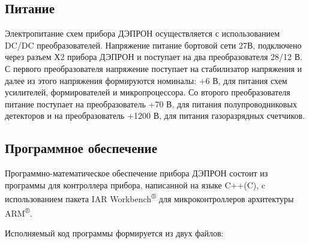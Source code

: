 \subsection{Питание}

Электропитание схем прибора ДЭПРОН осуществляется с использованием DC/DC преобразователей. Напряжение питание бортовой сети 27В, подключено через разъем Х2 прибора ДЭПРОН и поступает на два преобразователя 28/12 В. С первого преобразователя напряжение поступает на стабилизатор напряжения и далее из этого напряжения формируются номиналы: +6 В, для питания схем усилителей, формирователей и микропроцессора. Со второго преобразователя питание поступает на преобразователь +70 В, для питания полупроводниковых детекторов и на преобразователь +1200 В, для питания газоразрядных счетчиков. 

\subsection{Программное обеспечение}

Программно-математическое обеспечение прибора ДЭПРОН состоит из программы для контроллера прибора, написанной на языке C++(C), c использованием пакета IAR  Workbench\textsuperscript{®} для микроконтроллеров архитектуры ARM\textsuperscript{®}. 


Исполняемый код программы формируется из двух файлов: 


